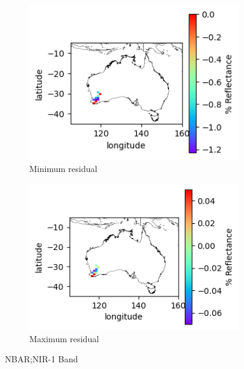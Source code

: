 \documentclass[a4paper]{article}
\begin{document}
      \begin{figure}[h!]
        \centering
          \begin{subfigure}[l]{.4\linewidth}
            \hspace{-32mm}
            \includegraphics[scale=0.9]{plots/nbar/nbar_nir_1-MinResidual.png}
            \caption{Minimum residual}
          \end{subfigure}
%
          \begin{subfigure}[r]{.4\linewidth}
            \includegraphics[scale=0.9]{plots/nbar/nbar_nir_1-MaxResidual.png}
            \caption{Maximum residual}
          \end{subfigure}
        \caption{NBAR;\@ NIR-1 Band}\label{figure:16}
      \end{figure}

  \clearpage
\end{document}
